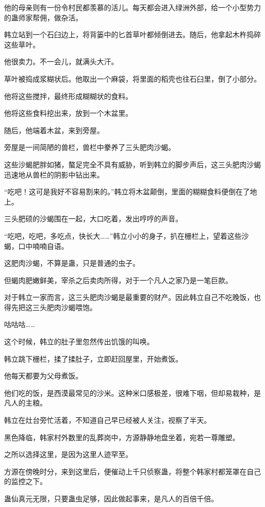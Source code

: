 \begin{this_body}
他的母亲则有一份令村民都羡慕的活儿。每天都会进入绿洲外部，给一个小型势力的蛊师家帮佣，做杂活。

韩立站到一个石臼边上，将背篓中的匕首草叶都倾倒进去。随后，他拿起木杵捣碎这些草叶。

他很卖力。不一会儿，就满头大汗。

草叶被捣成浆糊状后。他取出一个麻袋，将里面的稻壳也往石臼里，倒了小部分。

他将这些搅拌，最终形成糊糊状的食料。

他将这些食料挖出来，放到一个木盆里。

随后，他端着木盆，来到旁屋。

旁屋是一间简陋的兽栏，兽栏中豢养了三头肥肉沙蝎。

这些沙蝎肥胖如猪，螯足完全不具有威胁，听到韩立的脚步声后，这三头肥肉沙蝎迅速地从兽栏的阴影中钻出来。

“吃吧！这可是我好不容易割来的。”韩立将木盆颠倒，里面的糊糊食料便倒在了地上。

三头肥硕的沙蝎围在一起，大口吃着，发出哼哼的声音。

“吃吧，吃吧，多吃点，快长大……”韩立小小的身子，扒在栅栏上，望着这些沙蝎，口中喃喃自语。

这肥肉沙蝎，不算是蛊，只是普通的虫子。

但蝎肉肥嫩鲜美，宰杀之后卖肉所得，对于一个凡人之家乃是一笔巨款。

对于韩立一家而言，这三头肥肉沙蝎是最重要的财产。因此韩立自己不吃晚饭，也得先把这三头肥肉沙蝎喂饱。

咕咕咕……

这个时候，韩立的肚子里忽然传出饥饿的叫唤。

韩立跳下栅栏，揉了揉肚子，立即赶回屋里，开始煮饭。

他每天都要为父母煮饭。

他们吃的饭，是西漠最常见的沙米。这种米口感极差，很难下咽，但却易栽种，是凡人的主粮。

韩立在灶台旁忙活着，不知道自己早已经被人关注，视察了半天。

黑色降临，韩家村外数里的乱葬岗中，方源静静地盘坐着，宛若一尊雕塑。

之所以选择这里，是因为这里人迹罕至。

方源在傍晚时分，来到这里后，便催动上千只侦察蛊，将整个韩家村都笼罩在自己的监控之下。

蛊仙真元无限，只要蛊虫足够，因此做起事来，是凡人的百倍千倍。


\end{this_body}

